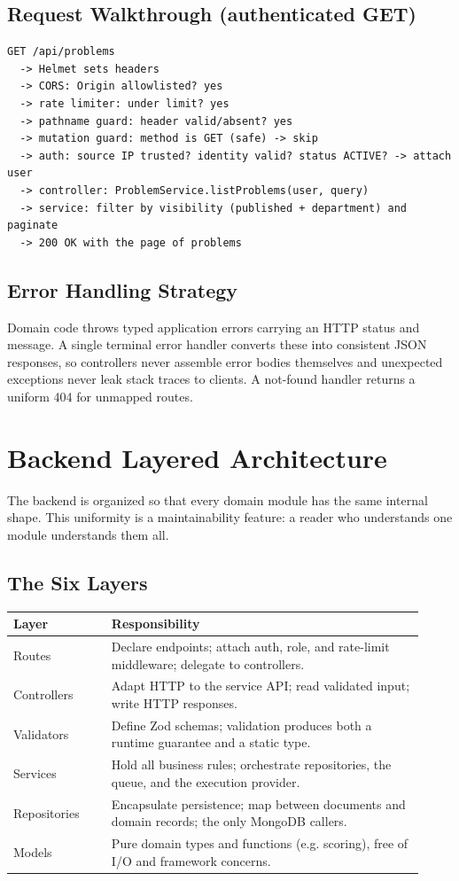 \documentclass[12pt,a4paper,oneside]{report}
\begin{document}
\section{Request Walkthrough (authenticated GET)}
\begin{lstlisting}[language={}]
GET /api/problems
  -> Helmet sets headers
  -> CORS: Origin allowlisted? yes
  -> rate limiter: under limit? yes
  -> pathname guard: header valid/absent? yes
  -> mutation guard: method is GET (safe) -> skip
  -> auth: source IP trusted? identity valid? status ACTIVE? -> attach user
  -> controller: ProblemService.listProblems(user, query)
  -> service: filter by visibility (published + department) and paginate
  -> 200 OK with the page of problems
\end{lstlisting}

\section{Error Handling Strategy}
Domain code throws typed application errors carrying an HTTP status and message.
A single terminal error handler converts these into consistent JSON responses,
so controllers never assemble error bodies themselves and unexpected exceptions
never leak stack traces to clients. A not-found handler returns a uniform 404 for
unmapped routes.

\chapter{Backend Layered Architecture}
The backend is organized so that every domain module has the same internal
shape. This uniformity is a maintainability feature: a reader who understands one
module understands them all.

\section{The Six Layers}
\begin{longtable}{@{}p{0.22\linewidth} p{0.70\linewidth}@{}}
\toprule
\textbf{Layer} & \textbf{Responsibility}\\
\midrule
\endhead
Routes & Declare endpoints; attach auth, role, and rate-limit middleware; delegate to controllers.\\
Controllers & Adapt HTTP to the service API; read validated input; write HTTP responses.\\
Validators & Define Zod schemas; validation produces both a runtime guarantee and a static type.\\
Services & Hold all business rules; orchestrate repositories, the queue, and the execution provider.\\
Repositories & Encapsulate persistence; map between documents and domain records; the only MongoDB callers.\\
Models & Pure domain types and functions (e.g. scoring), free of I/O and framework concerns.\\
\bottomrule
\end{longtable}
\end{document}
